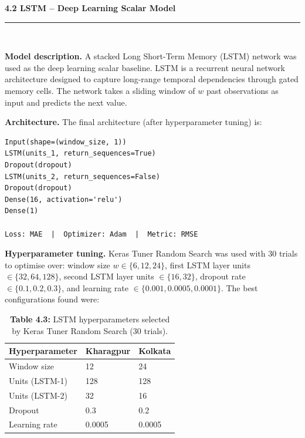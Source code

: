 \documentclass[12pt,a4paper]{report}
\begin{document}
\vspace{0.5cm}
\begin{center}
    \hypertarget{sec:s42}{}%
    {\large \textbf{4.2 LSTM -- Deep Learning Scalar Model}}\\[0.3cm]
    \noindent\rule{\linewidth}{0.4pt}\\[0.5cm]
\end{center}

\textbf{Model description.} A stacked Long Short-Term Memory (LSTM) network was used as the deep learning scalar baseline. LSTM is a recurrent neural network architecture designed to capture long-range temporal dependencies through gated memory cells. The network takes a sliding window of $w$ past observations as input and predicts the next value.

\textbf{Architecture.} The final architecture (after hyperparameter tuning) is:

\begin{lstlisting}[caption=LSTM architecture (Keras pseudo-code)]
Input(shape=(window_size, 1))
LSTM(units_1, return_sequences=True)
Dropout(dropout)
LSTM(units_2, return_sequences=False)
Dropout(dropout)
Dense(16, activation='relu')
Dense(1)

Loss: MAE  |  Optimizer: Adam  |  Metric: RMSE
\end{lstlisting}

\textbf{Hyperparameter tuning.} Keras Tuner Random Search was used with 30 trials to optimise over: window size $w \in \{6, 12, 24\}$, first LSTM layer units $\in \{32, 64, 128\}$, second LSTM layer units $\in \{16, 32\}$, dropout rate $\in \{0.1, 0.2, 0.3\}$, and learning rate $\in \{0.001, 0.0005, 0.0001\}$. The best configurations found were:

\begin{table}[H]
\centering
\caption*{\textbf{Table 4.3:} LSTM hyperparameters selected by Keras Tuner Random Search (30 trials).}
\begin{tabular}{lll}
\toprule
\textbf{Hyperparameter} & \textbf{Kharagpur} & \textbf{Kolkata} \\
\midrule
Window size     & 12 & 24 \\
Units (LSTM-1)  & 128 & 128 \\
Units (LSTM-2)  & 32  & 16  \\
Dropout         & 0.3 & 0.2 \\
Learning rate   & 0.0005 & 0.0005 \\
\bottomrule
\end{tabular}
\end{table}
\end{document}
